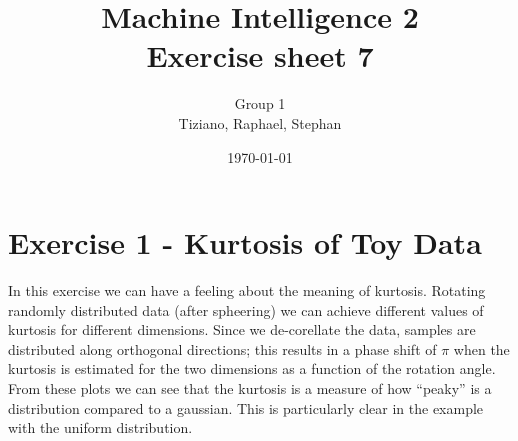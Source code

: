 \documentclass[a4paper,english]{article}
\title{Machine Intelligence 2 \\ Exercise sheet 7}
\author{Group 1 \\Tiziano, Raphael, Stephan}
\date{\today}
\begin{document}
\maketitle


\section*{Exercise 1 - Kurtosis of Toy Data}

In this exercise we can have a feeling about the meaning of kurtosis. Rotating randomly distributed data (after spheering) we can achieve different values of kurtosis for different dimensions.
Since we de-corellate the data, samples are distributed along orthogonal directions; this results in a phase shift of $\pi$ when the kurtosis is estimated for the two dimensions as a function of the rotation angle. From these plots we can see that the kurtosis is a measure of how ``peaky'' is a distribution compared to a gaussian. This is particularly clear in the example with the uniform distribution.
\end{document}
